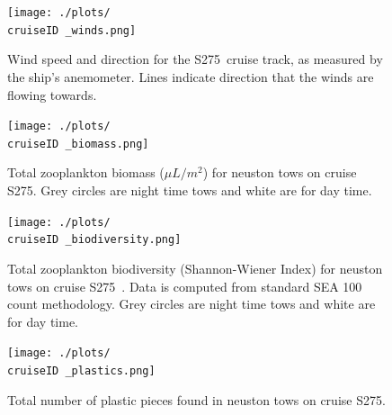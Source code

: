 \documentclass[letterpaper,11pt]{article}
\newcommand{\cruiseID}{S275}
\begin{document}
\begin{figure}[t]
\centering
\texttt{[image: ./plots/\\cruiseID \_winds.png]}
\caption[Wind vector summary]{Wind speed and direction for the \cruiseID\ cruise track, as measured by the ship’s anemometer. Lines indicate direction that the winds are flowing towards.}
\label{winds}
\end{figure}

\begin{figure}[t]
\centering
\texttt{[image: ./plots/\\cruiseID \_biomass.png]}
\caption[Zooplankton biomass]{Total zooplankton biomass ($\mu L/m^2$) for neuston tows on cruise \cruiseID. Grey circles are night time tows and white are for day time.}
\label{biomass}
\end{figure}

\begin{figure}[t]
\centering
\texttt{[image: ./plots/\\cruiseID \_biodiversity.png]}
\caption[Zooplankton Biodiversity]{Total zooplankton biodiversity (Shannon-Wiener Index) for neuston tows on cruise \cruiseID\ . Data is computed from standard SEA 100 count methodology. Grey circles are night time tows and white are for day time.}
\label{biodiversity}
\end{figure}

\begin{figure}[t]
\centering
\texttt{[image: ./plots/\\cruiseID \_plastics.png]}
\caption[Plastic Distribution]{Total number of plastic pieces found in neuston tows on cruise \cruiseID.}
\label{plastics}
\end{figure}
\end{document}
